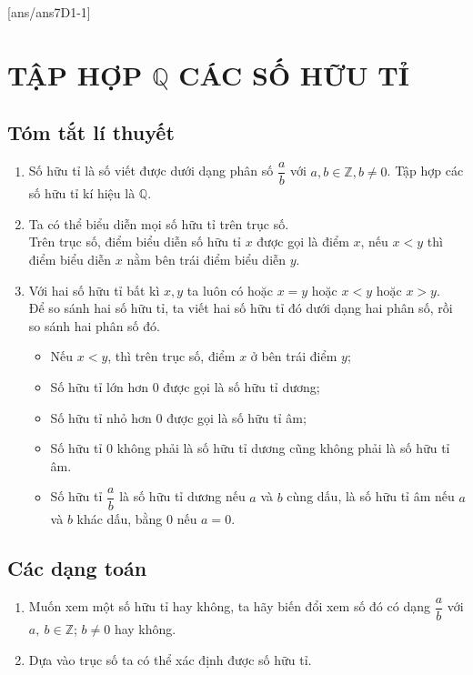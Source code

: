 [ans/ans7D1-1]
\section{TẬP HỢP $\mathbb{Q}$ CÁC SỐ HỮU TỈ}
\subsection{Tóm tắt lí thuyết}
\begin{enumerate}[\tickEX]
	\item Số hữu tỉ là số viết được dưới dạng phân số $\dfrac{a}{b}$ với $a, b\in\mathbb{Z}, b\neq 0$. Tập hợp các số hữu tỉ kí hiệu là $\mathbb{Q}$.
	\item Ta có thể biểu diễn mọi số hữu tỉ trên trục số.\\
	Trên trục số, điểm biểu diễn số hữu tỉ $x$ được gọi là điểm $x$, nếu $x<y$ thì điểm biểu diễn $x$ nằm bên trái điểm biểu diễn $y$.
\begin{center}
\end{center}
	\item Với hai số hữu tỉ bất kì $x, y$ ta luôn có hoặc $x=y$ hoặc $x<y$ hoặc $x>y$.\\
Để so sánh hai số hữu tỉ, ta viết hai số hữu tỉ đó dưới dạng hai phân số, rồi so sánh hai phân số đó.
	\begin{itemize}
		\item Nếu $x<y$, thì trên trục số, điểm $x$ ở bên trái điểm $y$;
		\item Số hữu tỉ lớn hơn $0$ được gọi là số hữu tỉ dương;
		\item Số hữu tỉ nhỏ hơn $0$ được gọi là số hữu tỉ âm;		
		\item Số hữu tỉ $0$ không phải là số hữu tỉ dương cũng không phải là số hữu tỉ âm.
		\item Số hữu tỉ $\dfrac{a}{b}$ là số hữu tỉ dương nếu $a$ và $b$ cùng dấu, là số hữu tỉ âm nếu $a$ và $b$ khác dấu, bằng $0$ nếu $a=0.$
	\end{itemize}
\end{enumerate}
\subsection{Các dạng toán}
\begin{dang}
\begin{enumerate}[\tickEX]
	\item Muốn xem một số hữu tỉ hay không, ta hãy biến đổi xem số đó có dạng $\dfrac{a}{b}$ với $a,\ b\in\mathbb{Z}$; $b\neq 0$ hay không.
	\item Dựa vào trục số ta có thể xác định được số hữu tỉ.
\end{enumerate}
\end{dang}

